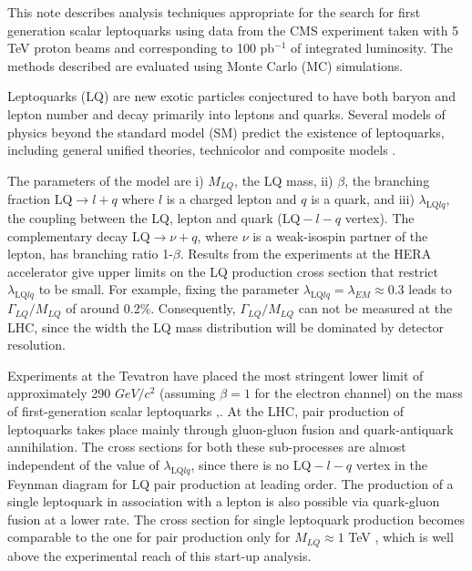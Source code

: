 \documentclass{cmspaper}
\begin{document}
\begin{linenumbers}
This note describes analysis techniques 
appropriate for the
search for first generation scalar leptoquarks 
using data from the CMS experiment taken with 5 TeV proton beams and 
corresponding to 100 pb$^{-1}$ of integrated luminosity.
The methods described are evaluated using 
Monte Carlo (MC) simulations.

Leptoquarks (LQ) are new exotic particles conjectured to have 
both baryon and lepton number and decay primarily into leptons and quarks.    
Several models of physics beyond the standard model (SM) 
predict the existence of leptoquarks, including general unified theories, 
technicolor and composite models \cite{theories}.  

The parameters of the model are i) $M_{LQ}$, the LQ mass, ii) $\beta$, 
the branching fraction 
$\mbox{LQ} \rightarrow l + q$
where $l$ is a charged lepton and $q$ is a quark, and
iii) $\lambda_{\mbox{LQ}lq}$, the coupling between the LQ, lepton and 
quark ($\mbox{LQ}-l-q$ vertex). 
The complementary decay $\mbox{LQ} \rightarrow \nu + q$, 
where $\nu$ is a weak-isospin partner of the lepton,
has branching ratio 1-$\beta$.
Results from the experiments at the HERA accelerator
give upper limits on the LQ production cross section that restrict  
$\lambda_{\mbox{LQ}lq}$ to be small\cite{hera}. 
For example, fixing the parameter 
$\lambda_{\mbox{LQ}lq} = \lambda_{EM} \approx 0.3$ leads to 
$\Gamma_{LQ}/M_{LQ}$ of around 0.2\%. 
Consequently, $\Gamma_{LQ}/M_{LQ}$ can not be measured at the LHC, 
since 
the width the LQ mass distribution will be 
dominated by detector resolution.  

Experiments at the Tevatron have placed the most stringent lower 
limit of approximately 290 $GeV/c^2$ (assuming $\beta=1$ for the electron channel) 
on the mass of first-generation scalar leptoquarks \cite{d02008},\cite{cdf2005}.
At the LHC, pair production of leptoquarks takes place 
mainly through gluon-gluon fusion and 
quark-antiquark annihilation. 
The cross sections for both these sub-processes are almost 
independent of the value of 
$\lambda_{\mbox{LQ}lq}$, since there is 
no $\mbox{LQ}-l-q$ vertex in the Feynman diagram for LQ pair production 
at leading order. 
The production of a single leptoquark in association with a lepton 
is also possible via quark-gluon 
fusion at a lower rate. 
The cross section for single leptoquark production
becomes comparable to the one for pair production only 
for $M_{LQ}\approx 1$ TeV \cite{LQSingleAndPairProd}, 
which is well above the experimental reach of this start-up analysis.  


\end{linenumbers}
\end{document}
